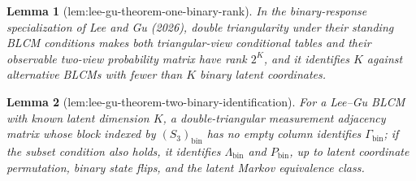 \documentclass{article}
\newtheorem{lemma}{Lemma}
\begin{document}
\begin{lemma}[lem:lee-gu-theorem-one-binary-rank]\label{lem:lee-gu-theorem-one-binary-rank}
In the binary-response specialization of Lee and Gu (2026), double
triangularity under their standing BLCM conditions makes both triangular-view
conditional tables and their observable two-view probability matrix have rank
\(2^K\), and it identifies \(K\) against alternative BLCMs with fewer than
\(K\) binary latent coordinates.
\end{lemma}

\begin{lemma}[lem:lee-gu-theorem-two-binary-identification]\label{lem:lee-gu-theorem-two-binary-identification}
For a Lee--Gu BLCM with known latent dimension \(K\), a double-triangular
measurement adjacency matrix whose block indexed by
\((S_3)_{\mathrm{bin}}\) has no empty column identifies
\(\Gamma_{\mathrm{bin}}\); if the subset condition also holds, it identifies
\(\Lambda_{\mathrm{bin}}\) and \(P_{\mathrm{bin}}\), up to latent coordinate
permutation, binary state flips, and the latent Markov equivalence class.
\end{lemma}
\end{document}
